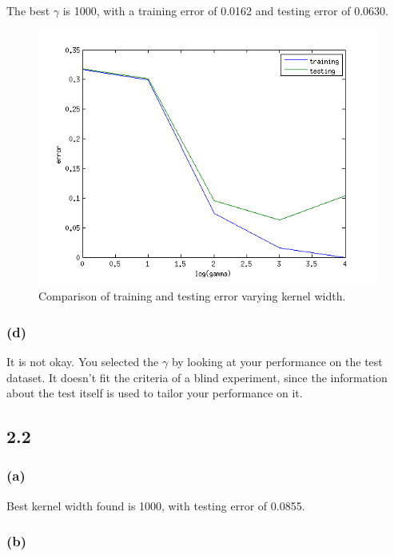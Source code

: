 \documentclass[letterpaper,10pt]{article} %
\begin{document}
The best $\gamma$ is 1000, with a training error of 0.0162 and testing error of 0.0630. 

\begin{figure}[h]
\centering
\includegraphics[width=\textwidth]{figs/p2kfold}
\caption{Comparison of training and testing error varying kernel width.}\label{fig:p2k}
\end{figure}

\subsubsection*{(d)}

It is not okay. You selected the $\gamma$ by looking at your performance on the test dataset. It doesn't fit the criteria of a blind experiment, since the information about the test itself is used to tailor your performance on it. 

\subsection*{2.2}

\subsubsection*{(a)}

Best kernel width found is 1000, with testing error of 0.0855.

\subsubsection*{(b)}
\end{document}
